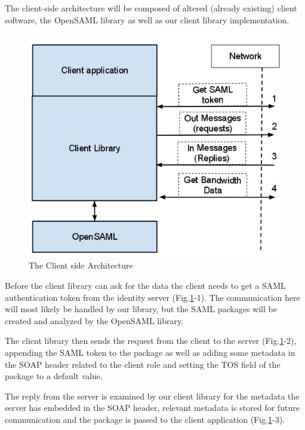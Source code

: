 \documentclass[12pt]{article}
\begin{document}
        The client-side architecture will be composed of altered (already existing) client software, the OpenSAML library as well as our client library implementation.
        
        \begin{figure}[htb]
            \centering
            \includegraphics[scale=0.4]{clientside}
            \caption{The Client side Architecture}
            \label{fig:clientside}
        \end{figure}
 
        Before the client library can ask for the data the client needs to get a SAML authentication token from the identity server (Fig.\ref{fig:clientside}-1). The communication here will most likely be handled by our library, but the SAML packages will be created and analyzed by the OpenSAML library. 

        The client library then sends the request from the client to the server (Fig.\ref{fig:clientside}-2), appending the SAML token to the package as well as adding some metadata in the SOAP header related to the client role and setting the TOS field of the package to a default value.

        The reply from the server is examined by our client library for the metadata the server has embedded in the SOAP header, relevant metadata is stored for future communication and the package is passed to the client application (Fig.\ref{fig:clientside}-3).
\end{document}
